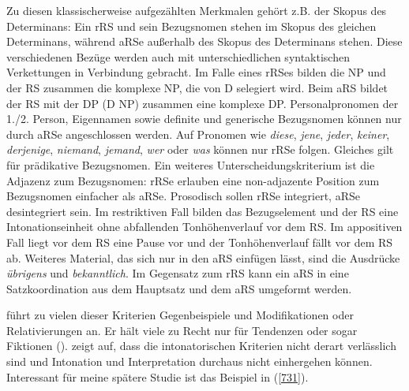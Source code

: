 Zu diesen klassischerweise aufgezählten Merkmalen gehört z.B. der Skopus  des Determinans: Ein rRS und sein Bezugsnomen  stehen im Skopus des glei\-chen Determinans, während aRSe außerhalb des Skopus des Determinans stehen. Diese verschiedenen Bezüge werden auch mit unterschiedlichen syntaktischen Verkettungen in Verbindung gebracht. Im Falle eines rRSes bilden die NP und der RS zusammen die komplexe NP, die von D selegiert wird. Beim aRS bildet der RS mit der DP (D NP) zusammen eine komplexe DP. Personalpronomen der 1./2. Person, Eigennamen sowie definite und generische Bezugsnomen können nur durch aRSe angeschlossen werden. Auf Pronomen wie \textit{diese}, \textit{jene}, \textit{jeder}, \textit{keiner}, \textit{derjenige}, \textit{niemand}, \textit{jemand}, \textit{wer} oder \textit{was} können nur rRSe folgen. Glei\-ches gilt für prädikative Bezugsnomen. Ein weiteres Unterscheidungskriterium ist die Adjazenz  zum Bezugsnomen: rRSe erlauben eine non-adjazente Position zum Bezugsnomen einfacher als aRSe. Prosodisch sollen rRSe  integriert, aRSe desintegriert sein. Im restriktiven Fall bilden das Bezugselement und der RS eine Intonationseinheit ohne abfallenden Tonhöhenverlauf vor dem RS. Im appositiven Fall liegt vor dem RS eine Pause vor und der Tonhöhenverlauf fällt vor dem RS ab. Weiteres Material, das sich nur in den aRS einfügen lässt, sind die Ausdrücke \textit{übrigens} und \textit{bekanntlich}. Im Gegensatz zum rRS kann ein aRS in eine Satzkoordination aus dem Hauptsatz und dem aRS umgeformt werden.

\citet[22]{Bluehdorn2007} führt zu vielen dieser Kriterien Gegenbeispiele und Mo\-difikationen oder Relativierungen an. Er hält viele zu Recht nur für \glqq Tendenzen\grqq{} oder \glqq sogar Fiktionen\grqq{} (\citeyear[30]{Bluehdorn2007}). \citet[191]{Schaffranietz1997} zeigt auf, dass die intonatorischen Kriterien nicht derart verlässlich sind und Intonation und Interpretation durchaus nicht einhergehen können. Interessant für meine spätere Studie ist das Beispiel in (\ref{731}).

